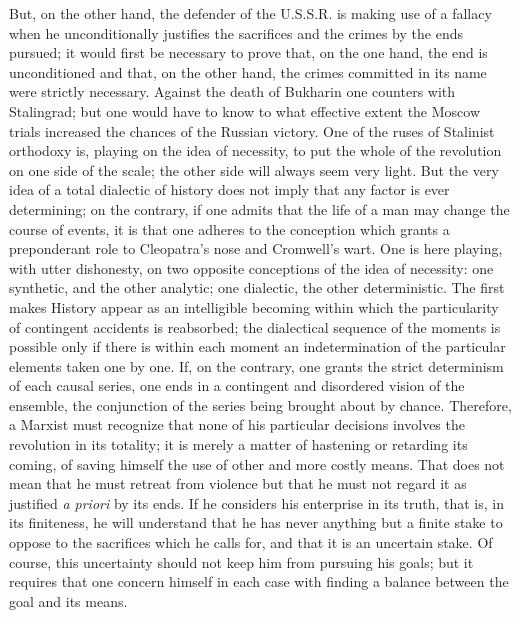 \documentclass[11pt]{article}
\begin{document}
{{But, on the other hand, the defender of the U.S.S.R. is making use of a fallacy when he unconditionally justifies the sacrifices and the crimes by the ends pursued; it would first be necessary to prove that, on the one hand, the end is unconditioned and that, on the other hand, the crimes committed in its name were strictly necessary. Against the death of Bukharin one counters with Stalingrad; but one would have to know to what effective extent the Moscow trials increased the chances of the Russian victory. One of the ruses of Stalinist orthodoxy is, playing on the idea of necessity, to put the whole of the revolution on one side of the scale; the other side will always seem very light. But the very idea of a total dialectic of history does not imply that any factor is ever determining; on the contrary, if one admits that the life of a man may change the course of events, it is that one adheres to the conception which grants a preponderant role to Cleopatra’s nose and Cromwell’s wart. One is here playing, with utter dishonesty, on two opposite conceptions of the idea of necessity: one synthetic, and the other analytic; one dialectic, the other deterministic. The first makes History appear as an intelligible becoming within which the particularity of contingent accidents is reabsorbed; the dialectical sequence of the moments is possible only if there is within each moment an indetermination of the particular elements taken one by one. If, on the contrary, one grants the strict determinism of each causal series, one ends in a contingent and disordered vision of the ensemble, the conjunction of the series being brought about by chance. Therefore, a Marxist must recognize that none of his particular decisions involves the revolution in its totality; it is merely a matter of hastening or retarding its coming, of saving himself the use of other and more costly means. That does not mean that he must retreat from violence but that he must not regard it as justified \textit{a priori} by its ends. If he considers his enterprise in its truth, that is, in its finiteness, he will understand that he has never anything but a finite stake to oppose to the sacrifices which he calls for, and that it is an uncertain stake. Of course, this uncertainty should not keep him from pursuing his goals; but it requires that one concern himself in each case with finding a balance between the goal and its means.

}}
\end{document}
